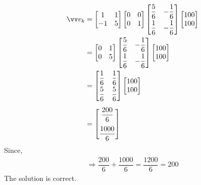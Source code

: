 \documentclass[10pt,a4paper]{article}
\numberwithin{equation}{section}
\begin{document}
			\begin{align*}
							\vv v_{k} &=\begin{bmatrix}
							1 & 1 \\ -1 & 5
							\end{bmatrix}
							\begin{bmatrix}
							0 & 0 \\ 0& 1
							\end{bmatrix}	
							\begin{bmatrix}
							\dfrac{5}{6} & -\dfrac{1}{6} \\[6pt]
							\dfrac{1}{6} & -\dfrac{1}{6}
							\end{bmatrix}
							\begin{bmatrix}
							100 \\ 100
							\end{bmatrix}\\
							&=\begin{bmatrix}
							0 & 1 \\ 0 & 5
							\end{bmatrix}	
							\begin{bmatrix}
							\dfrac{5}{6} & -\dfrac{1}{6} \\[6pt]
							\dfrac{1}{6} & -\dfrac{1}{6}
							\end{bmatrix}
							\begin{bmatrix}
							100 \\ 100
							\end{bmatrix}\\
							&=	
							\begin{bmatrix}
							\dfrac{1}{6} & \dfrac{1}{6} \\[6pt]
							\dfrac{5}{6} & \dfrac{5}{6}
							\end{bmatrix}
							\begin{bmatrix}
							100 \\ 100
							\end{bmatrix}\\[0.5em] & = \begin{bmatrix}
							\dfrac{200}{6} \\[1em] \dfrac{1000}{6} \\
							\end{bmatrix}
							\end{align*}
			Since, \begin{align*}
			\Rightarrow \dfrac{200}{6} + \dfrac{1000}{6} =\dfrac{1200}{6} = 200
			\end{align*}
			The solution is correct.
					 
\end{document}
